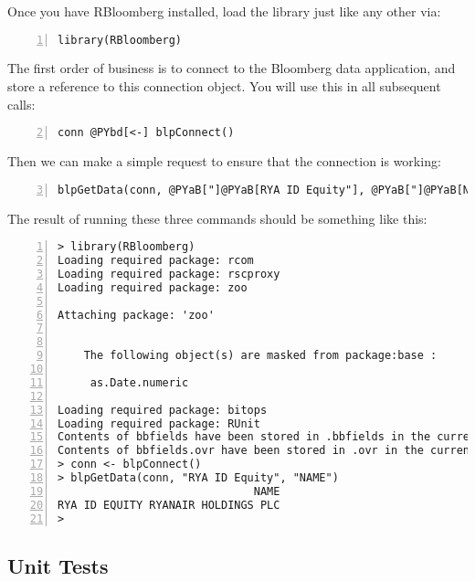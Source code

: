 \documentclass[a4paper]{article}
\begin{document}
Once you have RBloomberg installed, load the library just like any other via:

\begin{Verbatim}[commandchars=@\[\],numbers=left,firstnumber=1,stepnumber=1]
library(RBloomberg)
\end{Verbatim}

    

The first order of business is to connect to the Bloomberg data application, and store a reference to this connection object. You will use this in all subsequent calls:

\begin{Verbatim}[commandchars=@\[\],numbers=left,firstnumber=2,stepnumber=1]
conn @PYbd[<-] blpConnect()
\end{Verbatim}

    

Then we can make a simple request to ensure that the connection is working:

\begin{Verbatim}[commandchars=@\[\],numbers=left,firstnumber=3,stepnumber=1]
blpGetData(conn, @PYaB["]@PYaB[RYA ID Equity"], @PYaB["]@PYaB[NAME"])
\end{Verbatim}

    

The result of running these three commands should be something like this:

\begin{Verbatim}[commandchars=@\[\],numbers=left,firstnumber=1,stepnumber=1]
> library(RBloomberg)
Loading required package: rcom
Loading required package: rscproxy
Loading required package: zoo

Attaching package: 'zoo'


	The following object(s) are masked from package:base :

	 as.Date.numeric 

Loading required package: bitops
Loading required package: RUnit
Contents of bbfields have been stored in .bbfields in the current workspace
Contents of bbfields.ovr have been stored in .ovr in the current workspace
> conn <- blpConnect()
> blpGetData(conn, "RYA ID Equity", "NAME")
                              NAME
RYA ID EQUITY RYANAIR HOLDINGS PLC
> 
\end{Verbatim}

    


\subsection{Unit Tests} %
\label{sub:unit_tests}
\end{document}
